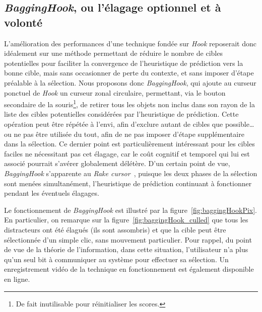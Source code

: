 	\subsection{\emph{BaggingHook}, ou l'élagage optionnel et à volonté}
	L'amélioration des performances d'une technique fondée sur \emph{Hook} reposerait donc idéalement sur une méthode permettant de réduire le nombre de cibles potentielles pour faciliter la convergence de l'heuristique de prédiction vers la bonne cible, mais sans occasionner de perte du contexte, et sans imposer d'étape préalable à la sélection. Nous proposons donc \emph{BaggingHook}, qui ajoute au curseur ponctuel de \emph{Hook} un curseur zonal circulaire, permettant, via le bouton secondaire de la souris\footnote{De fait inutilisable pour réinitialiser les scores.}, de retirer tous les objets non inclus dans son rayon de la liste des cibles potentielles considérées par l'heuristique de prédiction. Cette opération peut être répétée à l'envi, afin d'exclure autant de cibles que possible\ldots{} ou ne pas être utilisée du tout, afin de ne pas imposer d'étape supplémentaire dans la sélection. Ce dernier point est particulièrement intéressant pour les cibles faciles ne nécessitant pas cet élagage, car le coût cognitif et temporel qui lui est associé pourrait s'avérer globalement délétère. D'un certain point de vue, \emph{BaggingHook} s'apparente au \emph{Rake cursor}~\cite{blanch2009rake}, puisque les deux phases de la sélection sont menées simultanément, l'heuristique de prédiction continuant à fonctionner pendant les éventuels élagages.
	
	Le fonctionnement de \emph{BaggingHook} est illustré par la figure~\ref{fig:baggingHookPix}. En particulier, on remarque sur la figure~\ref{fig:baggingHook_culled} que tous les distracteurs ont été élagués (ils sont assombris) et que la cible peut être sélectionnée d'un simple clic, sans mouvement particulier. Pour rappel, du point de vue de la théorie de l'information, dans cette situation, l'utilisateur n'a plus qu'un seul bit à communiquer au système pour effectuer sa sélection. Un enregistrement vidéo de la technique en fonctionnement est également disponible en ligne.\footnotemark{}
	
	
